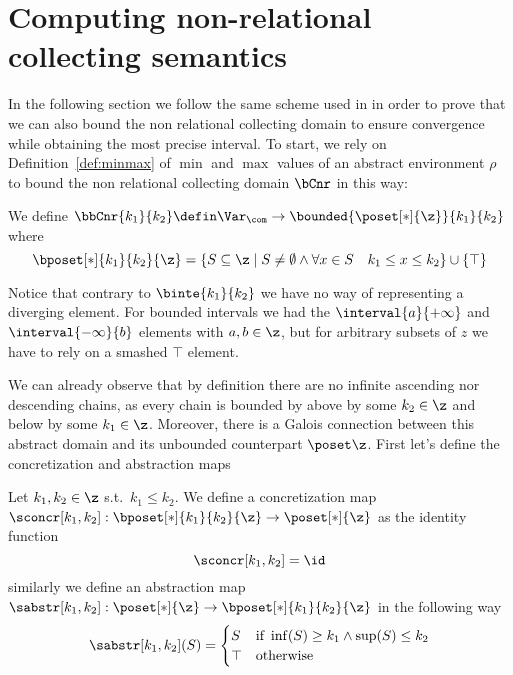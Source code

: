 \section{Computing non-relational collecting semantics}\label{sec:computingnonrel}

In the following section we follow the same scheme used in
 in order to prove that we can also bound
the non relational collecting domain to ensure convergence while
obtaining the most precise interval.  To start, we rely on
Definition~\ref{def:minmax} of \(\min\) and \(\max\) values of an
abstract environment \(\rho\) to bound the non relational collecting
domain \(\bCnr\) in this way:

\begin{definition}
  We define
  \(\bbCnr{k_1}{k_2} \defin \Var_{\com} \to \bounded{\poset[*]{\z}}{k_1}{k_2}\) where
  \begin{equation*}
    \bposet[*]{k_1}{k_2}{\z} = \{S \subseteq \z \mid S \neq \emptyset \land \forall x \in S \quad k_1 \leq x \leq k_2\} \cup \{\top\}
  \end{equation*}
\end{definition}
Notice that contrary to \(\binte{k_1}{k_2}\) we have no way of
representing a diverging element. For bounded intervals we had the
\(\interval{a}{+\infty}\) and \(\interval{-\infty}{b}\) elements with
\(a,b\in\z\), but for arbitrary subsets of \(z\) we have to rely on a
smashed \(\top\) element.

\medskip

\noindent
We can already observe that by definition there are no infinite
ascending nor descending chains, as every chain is bounded by above
by some \(k_2 \in \z\) and below by some \(k_1\in\z\). Moreover, there
is a Galois connection between this abstract domain and its unbounded
counterpart \(\poset\z\). First let's define the concretization and
abstraction maps

\begin{definition}\label{def:abstrnrb}
  Let \(k_1,k_2\in\z\) s.t.\ \(k_1 \leq k_2\). We define a
  concretization map
  \(\sconcr[k_1,k_2] : \bposet[*]{k_1}{k_2}{\z} \to \poset[*]{\z}\) as
  the identity function
  \begin{equation*}
    \sconcr[k_1,k_2] = \id
  \end{equation*}
  similarly we define an abstraction map
  \(\sabstr[k_1,k_2] : \poset[*]{\z} \to \bposet[*]{k_1}{k_2}{\z}\) in
  the following way
  \begin{equation*}
    \sabstr[k_1,k_2](S) = \begin{cases}
      S & \text{if } \inf(S) \geq k_1 \land \sup(S) \leq k_2 \\
      \top & \text{otherwise}
    \end{cases}
  \end{equation*}
\end{definition}

